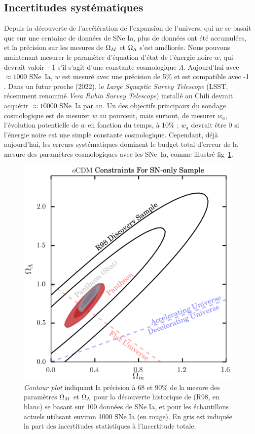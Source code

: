 \documentclass[a4paper, 12pt, svgnames]{article}
\begin{document}
\subsection{Incertitudes systématiques}\label{ssec:syst}

Depuis la découverte de l'accélération de l'expansion de l'univers, qui ne se
basait que sur une centaine de données de SNe Ia, plus de données ont été
accumulées, et la précision sur les mesures de $\Omega_M$ et $\Omega_\Lambda$ s'est
améliorée. Nous pouvons maintenant mesurer le paramètre d'équation d'état de
l'énergie noire $w$, qui devrait valoir $-1$ s'il s'agit d'une constante
cosmologique $\Lambda$. Aujourd'hui avec $\approx1000$ SNe~Ia, $w$ est mesuré
avec une précision de 5\% et est compatible avec -1 \cite{betoule_improved_2014,
scolnic_complete_2018}. Dans un futur proche (2022), le \textit{Large Synaptic
Survey Telescope} (LSST, récemment renommé \textit{Vera Rubin Survey Telescope})
installé au Chili devrait acquérir $\approx 10000$ SNe~Ia par an. Un des
objectifs principaux du sondage cosmologique est de mesurer $w$ au pourcent,
mais surtout, de mesurer $w_a$, l'évolution potentielle de $w$ en fonction du
temps, à 10\% ; $w_a$ devrait être 0 si l'énergie noire est une simple constante
cosmologique.  Cependant, déjà aujourd'hui, les erreurs systématiques dominent
le budget total d'erreur de la mesure des paramètres cosmologiques avec les
SNe~Ia, comme illustré fig~\ref{fig:scolnic_syst}. \bigbreak

\begin{figure}[htbp!]
    \centering
    \includegraphics[width=.5\linewidth]{Rapport_figures/scolnic_syst.png}
    \captionsetup{justification=centering}
    \caption{\textit{Contour plot} indiquant la précision à 68 et 90\% de la
    mesure des paramètres $\Omega_M$ et $\Omega_\Lambda$ pour la découverte historique de
     (R98, en blanc) se basant sur 100 données de SNe Ia, et
    pour les échantillons actuels utilisant environ 1000 SNe Ia (en rouge). En
    gris est indiquée la part des incertitudes statistiques à l'incertitude
    totale. \cite{scolnic_complete_2018}}
    \label{fig:scolnic_syst}
\end{figure}
\end{document}
